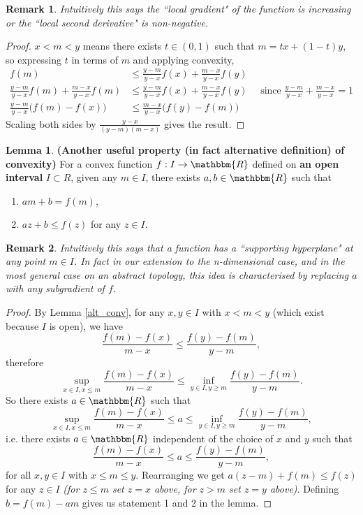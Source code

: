 \documentclass[10pt,a4paper]{article}
\theoremstyle{definition}
\newtheorem{lemma}[theorem]{Lemma}\newtheorem*{remark}{Remark}\newtheorem*{notation}{Notation}
\def\R{\mathbbm{R}}
\begin{document}
\begin{remark}
\textit{Intuitively this says the ``local gradient" of the function is increasing or the ``local second derivative" is non-negative.}
\end{remark}

\begin{proof}
$x < m < y$ means there exists $t \in (0,1)$ such that $m=tx + (1-t)y$, so expressing $t$ in terms of $m$ and applying convexity,
\begin{align*}
f(m) &\leq \frac{y-m}{y-x} f(x) + \frac{m-x}{y-x} f(y) \\
\frac{y-m}{y-x} f(m) + \frac{m-x}{y-x} f(m) &\leq \frac{y-m}{y-x} f(x) + \frac{m-x}{y-x} f(y) \quad \text{ 
since }\frac{y-m}{y-x} + \frac{m-x}{y-x}  = 1 \\
\frac{y-m}{y-x} \big( f(m) - f(x) \big) & \leq \frac{m-x}{y-x} \big( f(y) - f(m) \big)
\end{align*}
Scaling both sides by $\frac{y-x}{(y-m)(m-x)}$ gives the result.
\end{proof}

\begin{lemma} \label{prop_conv}\textbf{(Another useful property (in fact alternative definition) of convexity)} For a convex function $f: I \rightarrow \R$ defined on \textbf{an open interval} $I \subset R$, given any $m \in I$, there exists $a, b \in \R$ such that
\begin{enumerate}
\item $am+b = f(m),$
\item $az+b \leq f(z)$ for any $z \in I.$
\end{enumerate}
\end{lemma}

\begin{remark}
\textit{Intuitively this says that a function has a ``supporting hyperplane" at any point $m \in I$. In fact in our extension to the n-dimensional case, and in the most general case on an abstract topology, this idea is characterised by replacing $a$ with any subgradient of $f$.}
\end{remark}

\begin{proof}
By Lemma \ref{alt_conv}, for any $x, y \in I$ with $x<m<y$ (which exist because $I$ is open), we have
$$\frac{f(m)-f(x)}{m-x} \leq \frac{f(y)-f(m)}{y-m},$$ 
therefore 
$$\sup_{x \in I, x \leq m}\frac{f(m)-f(x)}{m-x} \leq \inf_{y \in I, y \geq m}\frac{f(y)-f(m)}{y-m}.$$ 
So there exists $a \in \R$ such that
$$\sup_{x \in I, x \leq m}\frac{f(m)-f(x)}{m-x} \leq a \leq \inf_{y \in I, y \geq m}\frac{f(y)-f(m)}{y-m},$$ 
i.e. there exists $a \in \R$ independent of the choice of $x$ and $y$ such that
$$\frac{f(m)-f(x)}{m-x} \leq a \leq \frac{f(y)-f(m)}{y-m},$$ 
for all $x, y \in I$ with $x \leq m \leq y$. Rearranging we get
$a(z-m) + f(m) \leq f(z)$
for any $z \in I$ \textit{(for $z \leq m$ set $z=x$ above, for $z > m$ set $z=y$ above)}. Defining $b = f(m) - am$ gives us statement 1 and 2 in the lemma. 
\end{proof}
\end{document}
